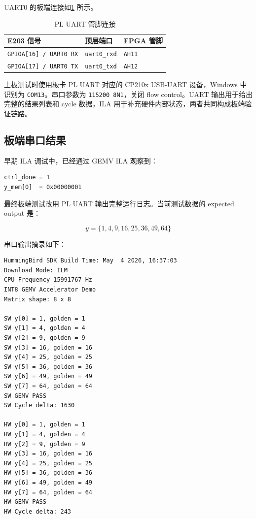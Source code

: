 \documentclass[12pt, a4paper]{article}
\begin{document}
UART0 的板端连接如\cref{tab:uart} 所示。

\begin{table}[H]
    \centering
    \caption{PL UART 管脚连接}
    \label{tab:uart}
    \begin{tabular}{lll}
        \toprule
        \textbf{E203 信号} & \textbf{顶层端口} & \textbf{FPGA 管脚} \\
        \midrule
        \texttt{GPIOA[16] / UART0 RX} & \texttt{uart0\_rxd} & \texttt{AH11} \\
        \texttt{GPIOA[17] / UART0 TX} & \texttt{uart0\_txd} & \texttt{AH12} \\
        \bottomrule
    \end{tabular}
\end{table}

上板测试时使用板卡 PL UART 对应的 CP210x USB-UART 设备，Windows 中识别为 \texttt{COM13}。串口参数为 \texttt{115200 8N1}，关闭 flow control。UART 输出用于给出完整的结果列表和 cycle 数据，ILA 用于补充硬件内部状态，两者共同构成板端验证链路。

\subsection{板端串口结果}

早期 ILA 调试中，已经通过 GEMV ILA 观察到：

\begin{lstlisting}[caption={当前 ILA 观测结果}]
ctrl_done = 1
y_mem[0]  = 0x00000001
\end{lstlisting}

最终板端测试改用 PL UART 输出完整运行日志。当前测试数据的 expected output 是：

\begin{equation}
    y=\{1,4,9,16,25,36,49,64\}
\end{equation}

串口输出摘录如下：

\begin{lstlisting}[caption={PL UART 板端输出摘录}]
HummingBird SDK Build Time: May  4 2026, 16:37:03
Download Mode: ILM
CPU Frequency 15991767 Hz
INT8 GEMV Accelerator Demo
Matrix shape: 8 x 8

SW y[0] = 1, golden = 1
SW y[1] = 4, golden = 4
SW y[2] = 9, golden = 9
SW y[3] = 16, golden = 16
SW y[4] = 25, golden = 25
SW y[5] = 36, golden = 36
SW y[6] = 49, golden = 49
SW y[7] = 64, golden = 64
SW GEMV PASS
SW Cycle delta: 1630

HW y[0] = 1, golden = 1
HW y[1] = 4, golden = 4
HW y[2] = 9, golden = 9
HW y[3] = 16, golden = 16
HW y[4] = 25, golden = 25
HW y[5] = 36, golden = 36
HW y[6] = 49, golden = 49
HW y[7] = 64, golden = 64
HW GEMV PASS
HW Cycle delta: 243
\end{lstlisting}
\end{document}
